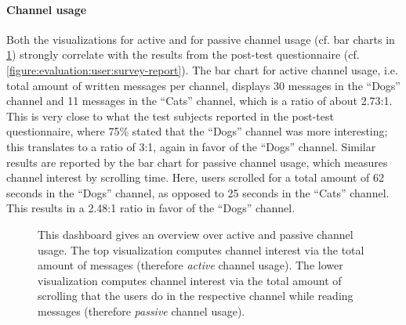\FloatBarrier

\paragraph{Channel usage}

Both the visualizations for active and for passive channel usage (cf. bar charts in \cref{figure:evaluation:user:dashboard-channels}) strongly correlate with the results from the post-test questionnaire (cf. \cref{figure:evaluation:user:survey-report}).
The bar chart for active channel usage, i.e. total amount of written messages per channel, displays 30 messages in the ``Dogs'' channel and 11 messages in the ``Cats'' channel, which is a ratio of about 2.73:1.
This is very close to what the test subjects reported in the post-test questionnaire, where 75\% stated that the ``Dogs'' channel was more interesting; this translates to a ratio of 3:1, again in favor of the ``Dogs'' channel.
Similar results are reported by the bar chart for passive channel usage, which measures channel interest by scrolling time.
Here, users scrolled for a total amount of 62 seconds in the ``Dogs'' channel, as opposed to 25 seconds in the ``Cats'' channel.
This results in a 2.48:1 ratio in favor of the ``Dogs'' channel.

\begin{figure}[t]
        \caption[Dashboard giving an overview over active and passive channel usage.]{
        This dashboard gives an overview over active and passive channel usage.
        The top visualization computes channel interest via the total amount of messages (therefore \emph{active} channel usage).
        The lower visualization computes channel interest via the total amount of scrolling that the users do in the respective channel while reading messages (therefore \emph{passive} channel usage).
        }
        \label{figure:evaluation:user:dashboard-channels}
\end{figure}

